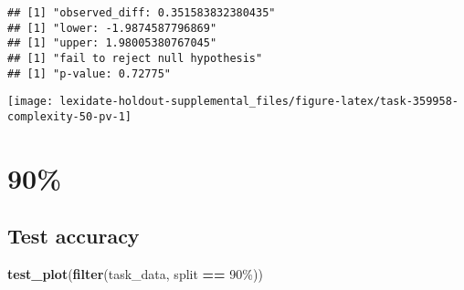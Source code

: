 \documentclass[
]{book}
\newenvironment{Shaded}{\begin{snugshade}}{\end{snugshade}}
\newcommand{\AttributeTok}[1]{\textcolor[rgb]{0.13,0.29,0.53}{#1}}
\newcommand{\DecValTok}[1]{\textcolor[rgb]{0.00,0.00,0.81}{#1}}
\newcommand{\FunctionTok}[1]{\textcolor[rgb]{0.13,0.29,0.53}{\textbf{#1}}}
\newcommand{\NormalTok}[1]{#1}
\newcommand{\OtherTok}[1]{\textcolor[rgb]{0.56,0.35,0.01}{#1}}
\newcommand{\SpecialCharTok}[1]{\textcolor[rgb]{0.81,0.36,0.00}{\textbf{#1}}}
\newcommand{\StringTok}[1]{\textcolor[rgb]{0.31,0.60,0.02}{#1}}
\begin{document}
\begin{Shaded}
\end{Shaded}

\begin{verbatim}
## [1] "observed_diff: 0.351583832380435"
## [1] "lower: -1.9874587796869"
## [1] "upper: 1.98005380767045"
## [1] "fail to reject null hypothesis"
## [1] "p-value: 0.72775"
\end{verbatim}

\texttt{[image: lexidate-holdout-supplemental\_files/figure-latex/task-359958-complexity-50-pv-1]}

\hypertarget{section-33}{%
\section{90\%}\label{section-33}}

\hypertarget{test-accuracy-33}{%
\subsection{Test accuracy}\label{test-accuracy-33}}

\begin{Shaded}
\begin{Highlighting}[]
\FunctionTok{test\_plot}\NormalTok{(}\FunctionTok{filter}\NormalTok{(task\_data, split }\SpecialCharTok{==} \StringTok{\textquotesingle{}90\%\textquotesingle{}}\NormalTok{))}
\end{Highlighting}
\end{Shaded}
\end{document}
